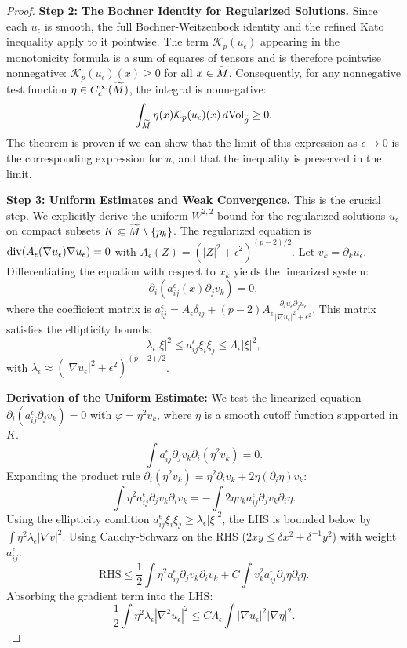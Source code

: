\begin{proof}
\textbf{Step 2: The Bochner Identity for Regularized Solutions.}
Since each $u_\epsilon$ is smooth, the full Bochner-Weitzenbock identity and the refined Kato inequality apply to it pointwise. The term $\mathcal{K}_p(u_\epsilon)$ appearing in the monotonicity formula is a sum of squares of tensors and is therefore pointwise nonnegative: $\mathcal{K}_p(u_\epsilon)(x) \ge 0$ for all $x \in \widetilde{M}$.
Consequently, for any nonnegative test function $\eta \in C^\infty_c(\widetilde{M})$, the integral is nonnegative:
\begin{equation}\label{eq:integral_inequality_eps}
    \int_{\widetilde{M}} \eta(x) \mathcal{K}_p(u_\epsilon)(x) \,d\text{Vol}_{\widetilde{g}} \ge 0.
\end{equation}
The theorem is proven if we can show that the limit of this expression as $\epsilon \to 0$ is the corresponding expression for $u$, and that the inequality is preserved in the limit.

\textbf{Step 3: Uniform Estimates and Weak Convergence.}
This is the crucial step. We explicitly derive the uniform $W^{2,2}$ bound for the regularized solutions $u_\epsilon$ on compact subsets $K \Subset \widetilde{M} \setminus \{p_k\}$.
The regularized equation is $\mathrm{div}(A_\epsilon(\nabla u_\epsilon) \nabla u_\epsilon) = 0$ with $A_\epsilon(Z) = (|Z|^2 + \epsilon^2)^{(p-2)/2}$.
Let $v_k = \partial_k u_\epsilon$. Differentiating the equation with respect to $x_k$ yields the linearized system:
\[ \partial_i ( a_{ij}^\epsilon(x) \partial_j v_k ) = 0, \]
where the coefficient matrix is $a_{ij}^\epsilon = A_\epsilon \delta_{ij} + (p-2)A_\epsilon \frac{\partial_i u_\epsilon \partial_j u_\epsilon}{|\nabla u_\epsilon|^2 + \epsilon^2}$.
This matrix satisfies the ellipticity bounds:
\[ \lambda_\epsilon |\xi|^2 \le a_{ij}^\epsilon \xi_i \xi_j \le \Lambda_\epsilon |\xi|^2, \]
with $\lambda_\epsilon \approx (|\nabla u_\epsilon|^2 + \epsilon^2)^{(p-2)/2}$.

\textbf{Derivation of the Uniform Estimate:}
We test the linearized equation $\partial_i (a_{ij}^\epsilon \partial_j v_k) = 0$ with $\varphi = \eta^2 v_k$, where $\eta$ is a smooth cutoff function supported in $K$.
\[ \int a_{ij}^\epsilon \partial_j v_k \partial_i (\eta^2 v_k) = 0. \]
Expanding the product rule $\partial_i (\eta^2 v_k) = \eta^2 \partial_i v_k + 2\eta (\partial_i \eta) v_k$:
\[ \int \eta^2 a_{ij}^\epsilon \partial_j v_k \partial_i v_k = - \int 2\eta v_k a_{ij}^\epsilon \partial_j v_k \partial_i \eta. \]
Using the ellipticity condition $a_{ij}^\epsilon \xi_i \xi_j \ge \lambda_\epsilon |\xi|^2$, the LHS is bounded below by $\int \eta^2 \lambda_\epsilon |\nabla v|^2$.
Using Cauchy-Schwarz on the RHS ($2xy \le \delta x^2 + \delta^{-1} y^2$) with weight $a_{ij}^\epsilon$:
\[ \text{RHS} \le \frac{1}{2} \int \eta^2 a_{ij}^\epsilon \partial_j v_k \partial_i v_k + C \int v_k^2 a_{ij}^\epsilon \partial_j \eta \partial_i \eta. \]
Absorbing the gradient term into the LHS:
\[ \frac{1}{2} \int \eta^2 \lambda_\epsilon |\nabla^2 u_\epsilon|^2 \le C \Lambda_\epsilon \int |\nabla u_\epsilon|^2 |\nabla \eta|^2. \]


\end{proof}
